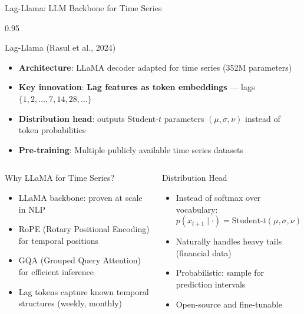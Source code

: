 \documentclass[9pt, aspectratio=169, t]{beamer}
\begin{document}
\begin{frame}{Lag-Llama: LLM Backbone for Time Series}
    \begin{cminipage}{0.95\textwidth}
    \vspace{-2mm}
    {\scriptsize
    \begin{block}{Lag-Llama (Rasul et al., 2024)}
        \begin{itemize}\setlength{\itemsep}{0pt}
            \item \textbf{Architecture}: LLaMA decoder adapted for time series (352M parameters)
            \item \textbf{Key innovation}: \textbf{Lag features as token embeddings} --- lags $\{1, 2, \ldots, 7, 14, 28, \ldots\}$
            \item \textbf{Distribution head}: outputs Student-$t$ parameters $(\mu, \sigma, \nu)$ instead of token probabilities
            \item \textbf{Pre-training}: Multiple publicly available time series datasets
        \end{itemize}
    \end{block}
    \vspace{-2mm}
    \begin{columns}[T]
        \begin{exampleblock}{Why LLaMA for Time Series?}
            \begin{itemize}\setlength{\itemsep}{0pt}
                \item LLaMA backbone: proven at scale in NLP
                \item RoPE (Rotary Positional Encoding) for temporal positions
                \item GQA (Grouped Query Attention) for efficient inference
                \item Lag tokens capture known temporal structures (weekly, monthly)
            \end{itemize}
        \end{exampleblock}

        \begin{alertblock}{Distribution Head}
            \begin{itemize}\setlength{\itemsep}{0pt}
                \item Instead of softmax over vocabulary:
                $$p(x_{t+1} \mid \cdot) = \text{Student-}t(\mu, \sigma, \nu)$$
                \item Naturally handles heavy tails (financial data)
                \item Probabilistic: sample for prediction intervals
                \item Open-source and fine-tunable
            \end{itemize}
        \end{alertblock}
    \end{columns}
    }
    \end{cminipage}
\end{frame}
\end{document}
